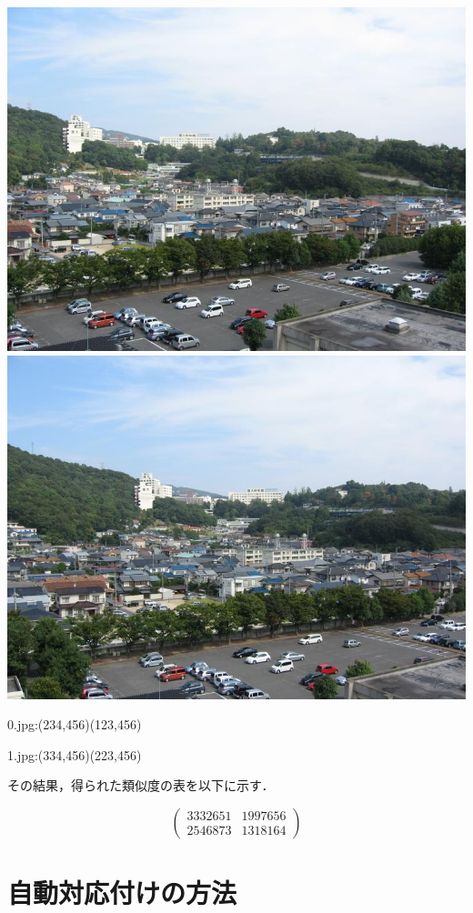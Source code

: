 \documentclass[11pt]{jarticle}
\begin{document}
\includegraphics[scale=.3]{./img/0.jpg}
\includegraphics[scale=.3]{./img/1.jpg}

0.jpg:(234,456)(123,456)

1.jpg:(334,456)(223,456)

その結果，得られた類似度の表を以下に示す．

\[
  \left(
    \begin{array}{cc}
      3332651 & 1997656 \\
      2546873 & 1318164 
    \end{array}
  \right)
\]

\section{自動対応付けの方法}
\end{document}
